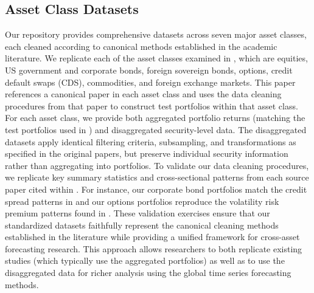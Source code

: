 \documentclass{article}
\begin{document}


\subsection{Asset Class Datasets}
Our repository provides comprehensive datasets across seven major asset classes, each cleaned according to canonical methods established in the academic literature. We replicate each of the asset classes examined in \cite{He2017}, which are equities, US government and corporate bonds, foreign sovereign bonds, options, credit default swaps (CDS), commodities, and foreign exchange markets. 
This paper references a canonical paper in each asset class and uses the data cleaning procedures from that paper to construct test portfolios within that asset class.
For each asset class, we provide both aggregated portfolio returns (matching the test portfolios used in \cite{He2017}) and disaggregated security-level data. The disaggregated datasets apply identical filtering criteria, subsampling, and transformations as specified in the original papers, but preserve individual security information rather than aggregating into portfolios. 
To validate our data cleaning procedures, we replicate key summary statistics and cross-sectional patterns from each source paper cited within \cite{He2017}. For instance, our corporate bond portfolios match the credit spread patterns in \cite{Nozawa2017} and our options portfolios reproduce the volatility risk premium patterns found in \cite{Constantinides2013}. These validation exercises ensure that our standardized datasets faithfully represent the canonical cleaning methods established in the literature while providing a unified framework for cross-asset forecasting research. This approach allows researchers to both replicate existing studies (which typically use the aggregated portfolios) as well as to use the disaggregated data for richer analysis using the global time
series forecasting methods.
\end{document}
